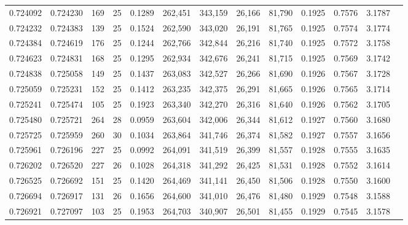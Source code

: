 \begin{tabular}{rrrrrrrrrrrrr}
0.724092 & 0.724230 &   169 &  25 &                                     0.1289 & 262,451 & 343,159 &  26,166 &  81,790 & 0.1925 & 0.7576 & 3.1787 \\
0.724232 & 0.724383 &   139 &  25 &                                     0.1524 & 262,590 & 343,020 &  26,191 &  81,765 & 0.1925 & 0.7574 & 3.1774 \\
0.724384 & 0.724619 &   176 &  25 &                                     0.1244 & 262,766 & 342,844 &  26,216 &  81,740 & 0.1925 & 0.7572 & 3.1758 \\
0.724623 & 0.724831 &   168 &  25 &                                     0.1295 & 262,934 & 342,676 &  26,241 &  81,715 & 0.1925 & 0.7569 & 3.1742 \\
0.724838 & 0.725058 &   149 &  25 &                                     0.1437 & 263,083 & 342,527 &  26,266 &  81,690 & 0.1926 & 0.7567 & 3.1728 \\
0.725059 & 0.725231 &   152 &  25 &                                     0.1412 & 263,235 & 342,375 &  26,291 &  81,665 & 0.1926 & 0.7565 & 3.1714 \\
0.725241 & 0.725474 &   105 &  25 &                                     0.1923 & 263,340 & 342,270 &  26,316 &  81,640 & 0.1926 & 0.7562 & 3.1705 \\
0.725480 & 0.725721 &   264 &  28 &                                     0.0959 & 263,604 & 342,006 &  26,344 &  81,612 & 0.1927 & 0.7560 & 3.1680 \\
0.725725 & 0.725959 &   260 &  30 &                                     0.1034 & 263,864 & 341,746 &  26,374 &  81,582 & 0.1927 & 0.7557 & 3.1656 \\
0.725961 & 0.726196 &   227 &  25 &                                     0.0992 & 264,091 & 341,519 &  26,399 &  81,557 & 0.1928 & 0.7555 & 3.1635 \\
0.726202 & 0.726520 &   227 &  26 &                                     0.1028 & 264,318 & 341,292 &  26,425 &  81,531 & 0.1928 & 0.7552 & 3.1614 \\
0.726525 & 0.726692 &   151 &  25 &                                     0.1420 & 264,469 & 341,141 &  26,450 &  81,506 & 0.1928 & 0.7550 & 3.1600 \\
0.726694 & 0.726917 &   131 &  26 &                                     0.1656 & 264,600 & 341,010 &  26,476 &  81,480 & 0.1929 & 0.7548 & 3.1588 \\
0.726921 & 0.727097 &   103 &  25 &                                     0.1953 & 264,703 & 340,907 &  26,501 &  81,455 & 0.1929 & 0.7545 & 3.1578 \\

\end{tabular}

